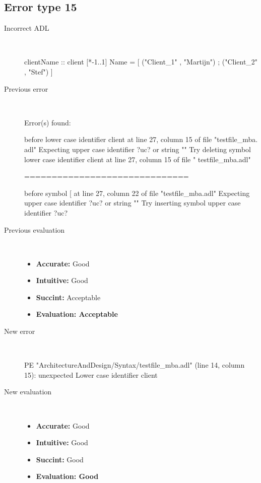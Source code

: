 \hrulefill

\subsection{Error type 15}
  \begin{description}
  \item[Incorrect ADL]~\\
\begin{adl}
clientName :: client [*-1..1] Name =
    [ ("Client_1"      , "Martijn")
    ; ("Client_2"      , "Stef")
    ]\end{adl}
  \item[Previous error]~\\
\begin{haskell}
Error(s) found:

before lower case identifier client at line 27, column 15 of file "testfile_mba.
adl"
Expecting upper case identifier ?uc? or string ""
Try deleting symbol lower case identifier client at line 27, column 15 of file "
testfile_mba.adl"

==============================

before symbol [ at line 27, column 22 of file "testfile_mba.adl"
Expecting upper case identifier ?uc? or string ""
Try inserting symbol upper case identifier ?uc?\end{haskell}
  \item[Previous evaluation]~\\
    \begin{itemize}
    \item \textbf{Accurate:} Good
    \item \textbf{Intuitive:} Good
    \item \textbf{Succint:} Acceptable
    \item \textbf{Evaluation: Acceptable}
    \end{itemize}
  \item[New error]~\\
\begin{haskell}
PE "ArchitectureAndDesign/Syntax/testfile_mba.adl" (line 14, column 15):
unexpected Lower case identifier client\end{haskell}
  \item[New evaluation]~\\
    \begin{itemize}
    \item \textbf{Accurate:} Good
    \item \textbf{Intuitive:} Good
    \item \textbf{Succint:} Good
    \item \textbf{Evaluation: Good
}
    \end{itemize}
  \end{description}

